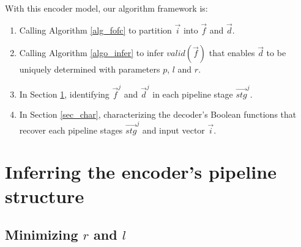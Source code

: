 \documentclass[conference]{IEEEtran}
\begin{document}




With this encoder model,
our algorithm framework is:

\begin{enumerate}
 \item Calling Algorithm \ref{alg_fofc} to partition $\vec{i}$ into $\vec{f}$ and $\vec{d}$.
 \item Calling Algorithm \ref{algo_infer} to infer $valid(\vec{f})$ that enables $\vec{d}$ 
 to be uniquely determined with parameters $p$, $l$ and $r$.
 \item In Section \ref{sec_pipeinfer}, 
 identifying $\vec{f}^j$ and $\vec{d}^j$ in each pipeline stage $\vec{stg}^j$. 
 \item In Section \ref{sec_char}, 
 characterizing the decoder's Boolean functions that recover each pipeline stages $\vec{stg}^j$
 and input vector $\vec{i}$.
\end{enumerate}



\section{Inferring the encoder's pipeline structure}\label{sec_pipeinfer}


\subsection{Minimizing $r$ and $l$}\label{reduceing}
\end{document}
